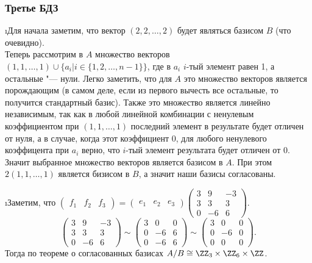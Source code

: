 \subsubsection{Третье БДЗ}

\i Для начала заметим, что вектор $(2, 2, \ldots, 2)$ будет являться базисом $B$ (что очевидно).\\
Теперь рассмотрим в $A$ множество векторов $(1, 1, \ldots, 1) \cup \{a_i| i \in \{1, 2, \ldots, n-1\}\}$, где в $a_i$ $i$-тый элемент равен 1, а остальные "--- нули. Легко заметить, что для $A$ это множество векторов является порождающим (в самом деле, если из первого вычесть все остальные, то получится стандартный базис). Также это множество является линейно независимым, так как в любой линейной комбинации с ненулевым коэффициентом при $(1, 1, \ldots, 1)$ последний элемент в результате будет отличен от нуля, а в случае, когда этот коэффициент 0, для любого ненулевого коэффицента при $a_i$ верно, что $i$-тый элемент результата будет отличен от 0. Значит выбранное множество векторов является базисом в $A$. При этом $2(1, 1, \ldots, 1)$ является бизисом в $B$, а значит наши базисы согласованы.

\i Заметим, что $\begin{pmatrix}
    f_1 & f_2 & f_3
\end{pmatrix} = \begin{pmatrix}
    e_1 & e_2 & e_3
\end{pmatrix}\begin{pmatrix}
    3 & 9 & -3\\
    3 & 3 & 3\\
    0 & -6 & 6
\end{pmatrix}.$
$$\begin{pmatrix}
    3 & 9 & -3\\
    3 & 3 & 3\\
    0 & -6 & 6
\end{pmatrix} \sim \begin{pmatrix}
    3 & 0 & 0\\
    0 & -6 & 6\\
    0 & -6 & 6
\end{pmatrix} \sim \begin{pmatrix}
    3 & 0 & 0\\
    0 & -6 & 0\\
    0 & 0 & 0
\end{pmatrix}.$$
Тогда по теореме о согласованных базисах $A/B \cong \ZZ_3 \times \ZZ_6 \times \ZZ$.

